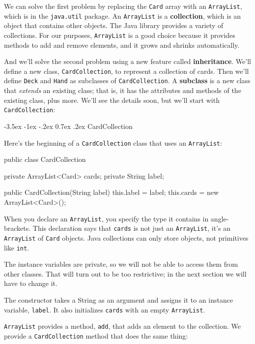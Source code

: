 \documentclass[12pt]{book}
\makeatletter
\theoremstyle{exercise}
\newcommand{\java}[1]{\verb"#1"}
\renewcommand{\section}{\@startsection{section}{1}{\z@}%
    {-3.5ex \@plus -1ex \@minus -.2ex}%
    {0.7ex \@plus.2ex}%
    {\normalfont\Large\bfseries}}
\newcommand{\java}[1]{\lstinline{#1}} %
\makeatother
\begin{document}
We can solve the first problem by replacing the \java{Card} array with an \java{ArrayList}, which is in the \java{java.util} package.
An \java{ArrayList} is a {\bf collection}, which is an object that contains other objects.
The Java library provides a variety of collections.
For our purposes, \java{ArrayList} is a good choice because it provides methods to add and remove elements, and it grows and shrinks automatically.

And we'll solve the second problem using a new feature called {\bf inheritance}.
We'll define a new class, \java{CardCollection}, to represent a collection of cards.
Then we'll define \java{Deck} and \java{Hand} as subclasses of \java{CardCollection}.
A {\bf subclass} is a new class that {\em extends} an existing class; that is, it has the attributes and methods of the existing class, plus more.
We'll see the details soon, but we'll start with \java{CardCollection}:


\section{CardCollection}

Here's the beginning of a \java{CardCollection} class that uses an \java{ArrayList}:

\begin{code}
public class CardCollection {    

    private ArrayList<Card> cards;
    private String label;
    
    public CardCollection(String label) {
        this.label = label;
        this.cards = new ArrayList<Card>();
    }
}
\end{code}

When you declare an \java{ArrayList}, you specify the type it contains in angle-brackets.
This declaration says that \java{cards} is not just an \java{ArrayList}, it's an \java{ArrayList} of \java{Card} objects.
Java collections can only store objects, not primitives like \java{int}.

The instance variables are private, so we will not be able to access them from other classes.
That will turn out to be too restrictive; in the next section we will have to change it.

The constructor takes a String as an argument and assigns it to an instance variable, \java{label}.
It also initializes \java{cards} with an empty \java{ArrayList}.

\java{ArrayList} provides a method, \java{add}, that adds an element to the collection.
We provide a \java{CardCollection} method that does the same thing:
\end{document}
